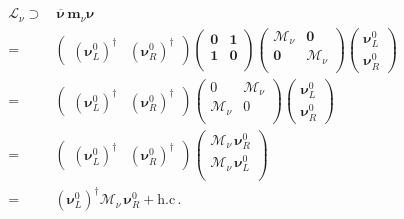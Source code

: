 \begin{align}
    \mathcal{L}_{\nu}\supset &\, \overline{\boldsymbol{\nu}}\, \boldsymbol{m}_{\nu} \boldsymbol{\nu}   \nonumber\\
=&  \begin{pmatrix}
    \left( \boldsymbol{\nu}_L^0 \right)^{\dagger}&
    \left(\boldsymbol{\nu}_R^0  \right)^{\dagger}
  \end{pmatrix}
                                    \begin{pmatrix}
                                      \boldsymbol{0} & \boldsymbol{1} \\
                                      \boldsymbol{1} & \boldsymbol{0} \\
                                    \end{pmatrix}
  \begin{pmatrix}
                                      \boldsymbol{\mathcal{M}}_{\nu} & \boldsymbol{0} \\
                                      \boldsymbol{0} & \boldsymbol{\mathcal{M}}_{\nu}  \\
                                    \end{pmatrix}
\begin{pmatrix}
    \boldsymbol{\nu}_L^{0} \\
    \boldsymbol{\nu}_R^{0}
  \end{pmatrix} \nonumber\\
=&  \begin{pmatrix}
    \left( \boldsymbol{\nu}_L^0 \right)^{\dagger}&
    \left(\boldsymbol{\nu}_R^0  \right)^{\dagger}
  \end{pmatrix}
  \begin{pmatrix}
                                      0 & \boldsymbol{\mathcal{M}}_{\nu} \\
                                      \boldsymbol{\mathcal{M}}_{\nu} & 0 \\
                                    \end{pmatrix}
\begin{pmatrix}
    \boldsymbol{\nu}_L^{0} \\
    \boldsymbol{\nu}_R^{0}
  \end{pmatrix} \nonumber\\
=&  \begin{pmatrix}
    \left( \boldsymbol{\nu}_L^0 \right)^{\dagger}&
    \left(\boldsymbol{\nu}_R^0  \right)^{\dagger}
  \end{pmatrix}
  \begin{pmatrix}
         \boldsymbol{\mathcal{M}}_{\nu}\,\boldsymbol{\nu}_R^{0} \\
    \boldsymbol{\mathcal{M}}_{\nu}\, \boldsymbol{\nu}_L^{0} \\
  \end{pmatrix} \nonumber\\
  =&\left( \boldsymbol{\nu}_L^0 \right)^{\dagger} \boldsymbol{\mathcal{M}}_{\nu}\,   \boldsymbol{\nu}_R^{0} +\text{h.c}\,.
\end{align}
